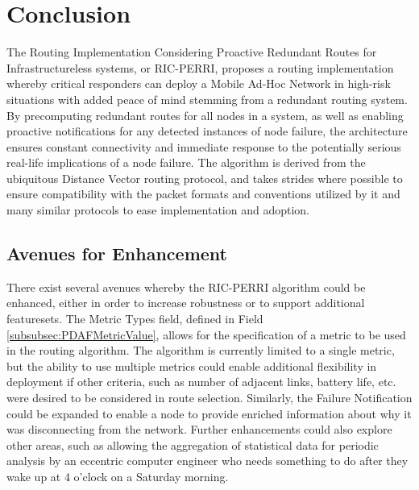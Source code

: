\section{Conclusion}\label{sec:conclusion}
The Routing Implementation Considering Proactive Redundant Routes for Infrastructureless systems, or RIC-PERRI, proposes a routing implementation whereby critical responders can deploy a Mobile Ad-Hoc Network in high-risk situations with added peace of mind stemming from a redundant routing system. By precomputing redundant routes for all nodes in a system, as well as enabling proactive notifications for any detected instances of node failure, the architecture ensures constant connectivity and immediate response to the potentially serious real-life implications of a node failure. The algorithm is derived from the ubiquitous Distance Vector routing protocol, and takes strides where possible to ensure compatibility with the packet formats and conventions utilized by it and many similar protocols to ease implementation and adoption.

\subsection{Avenues for Enhancement}
There exist several avenues whereby the RIC-PERRI algorithm could be enhanced, either in order to increase robustness or to support additional featuresets. The Metric Types field, defined in Field \ref{subsubsec:PDAFMetricValue}, allows for the specification of a metric to be used in the routing algorithm. The algorithm is currently limited to a single metric, but the ability to use multiple metrics could enable additional flexibility in deployment if other criteria, such as number of adjacent links, battery life, etc. were desired to be considered in route selection. Similarly, the Failure Notification could be expanded to enable a node to provide enriched information about why it was disconnecting from the network. Further enhancements could also explore other areas, such as allowing the aggregation of statistical data for periodic analysis by an eccentric computer engineer who needs something to do after they wake up at 4 o'clock on a Saturday morning.